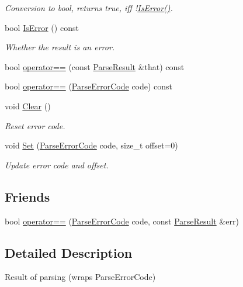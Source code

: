 \begin{DoxyCompactItemize}
\begin{DoxyCompactList}\small\item\em Conversion to {\ttfamily bool}, returns {\ttfamily true}, iff !\hyperlink{structParseResult_a07c35a6769f5cb8a73cbc56c41e60a2a}{Is\+Error()}. \end{DoxyCompactList}\item 
bool \hyperlink{structParseResult_a07c35a6769f5cb8a73cbc56c41e60a2a}{Is\+Error} () const 
\begin{DoxyCompactList}\small\item\em Whether the result is an error. \end{DoxyCompactList}\item 
bool \hyperlink{structParseResult_a90794619408c295ffa923f3307526bed}{operator==} (const \hyperlink{structParseResult}{Parse\+Result} \&that) const 
\item 
bool \hyperlink{structParseResult_a5a0bd70f5bbb383ac63a6450ac4ae4d1}{operator==} (\hyperlink{group__RAPIDJSON__ERRORS_ga8d4b32dfc45840bca189ade2bbcb6ba7}{Parse\+Error\+Code} code) const 
\item 
void \hyperlink{structParseResult_a88b6d44f052a19e6436ae6aadc2c40b4}{Clear} ()
\begin{DoxyCompactList}\small\item\em Reset error code. \end{DoxyCompactList}\item 
void \hyperlink{structParseResult_aa81b4a7b776b77216cb752385203a8c1}{Set} (\hyperlink{group__RAPIDJSON__ERRORS_ga8d4b32dfc45840bca189ade2bbcb6ba7}{Parse\+Error\+Code} code, size\+\_\+t offset=0)
\begin{DoxyCompactList}\small\item\em Update error code and offset. \end{DoxyCompactList}\end{DoxyCompactItemize}
\subsection*{Friends}
\begin{DoxyCompactItemize}
\item 
bool \hyperlink{structParseResult_a58c9982e833d1c74686506ac7449200c}{operator==} (\hyperlink{group__RAPIDJSON__ERRORS_ga8d4b32dfc45840bca189ade2bbcb6ba7}{Parse\+Error\+Code} code, const \hyperlink{structParseResult}{Parse\+Result} \&err)
\end{DoxyCompactItemize}


\subsection{Detailed Description}
Result of parsing (wraps Parse\+Error\+Code) 


